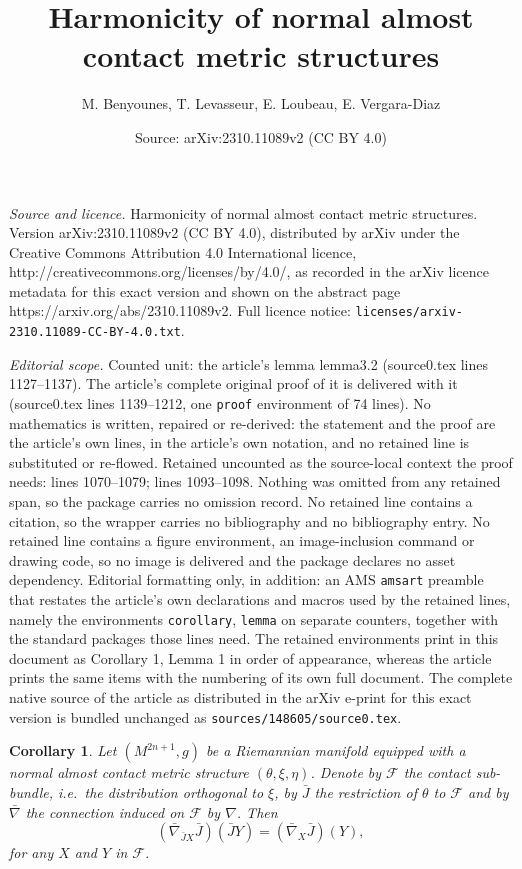 \documentclass[10pt,a4paper]{amsart}
\title{Harmonicity of normal almost contact metric structures}
\author{M. Benyounes, T. Levasseur, E. Loubeau, E. Vergara-Diaz}
\date{Source: arXiv:2310.11089v2 (CC BY 4.0)}
\newtheorem{corollary}{Corollary}
\newcommand{\f}{\mathcal{F}}
\begin{document}
\maketitle

\noindent\emph{Source and licence.} Harmonicity of normal almost contact metric structures. Version arXiv:2310.11089v2 (CC BY 4.0), distributed by arXiv under the Creative Commons Attribution 4.0 International licence, http://creativecommons.org/licenses/by/4.0/, as recorded in the arXiv licence metadata for this exact version and shown on the abstract page https://arxiv.org/abs/2310.11089v2. Full licence notice: \texttt{licenses/arxiv-2310.11089-CC-BY-4.0.txt}.\par\smallskip

\noindent\textit{Editorial scope.} Counted unit: the article's lemma lemma3.2 (source0.tex lines 1127--1137). The article's complete original proof of it is delivered with it (source0.tex lines 1139--1212, one \texttt{proof} environment of 74 lines). No mathematics is written, repaired or re-derived: the statement and the proof are the article's own lines, in the article's own notation, and no retained line is substituted or re-flowed.  Retained uncounted as the source-local context the proof needs: lines 1070--1079; lines 1093--1098.  Nothing was omitted from any retained span, so the package carries no omission record.  No retained line contains a citation, so the wrapper carries no bibliography and no bibliography entry.  No retained line contains a figure environment, an image-inclusion command or drawing code, so no image is delivered and the package declares no asset dependency.  Editorial formatting only, in addition: an AMS \texttt{amsart} preamble that restates the article's own declarations and macros used by the retained lines, namely the environments \texttt{corollary}, \texttt{lemma} on separate counters, together with the standard packages those lines need.  The retained environments print in this document as Corollary 1, Lemma 1 in order of appearance, whereas the article prints the same items with the numbering of its own full document.  The complete native source of the article as distributed in the arXiv e-print for this exact version is bundled unchanged as \texttt{sources/148605/source0.tex}.
\begin{corollary}\label{corollary1}
  Let $(M^{2n+1},g)$ be a Riemannian manifold equipped with a
  normal almost contact metric structure
  $(\theta,\xi,\eta)$. Denote by $\f$ the contact sub-bundle,
  i.e.~the distribution orthogonal to $\xi$, by $\bar{J}$ the
  restriction of $\theta$ to $\f$ and by $\bar{\nabla}$ the
  connection induced on $\f$ by $\nabla$. Then
$$(\bar{\nabla}_{\bar{J}X}\bar{J})(\bar{J}Y) = (\bar{\nabla}_X \bar{J})(Y),$$
for any $X$ and $Y$ in $\f$.
\end{corollary}
\end{document}
